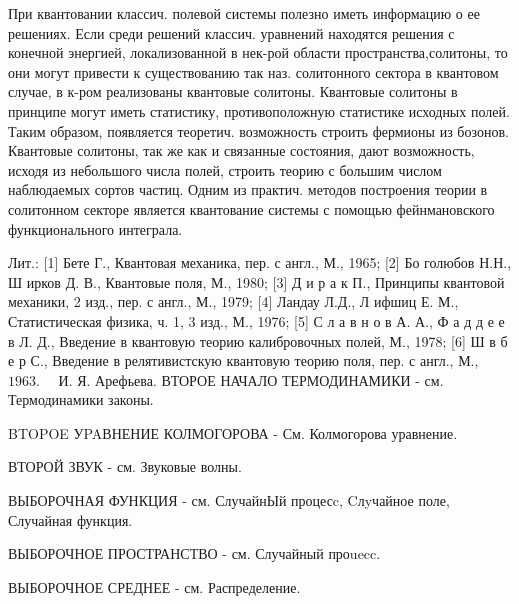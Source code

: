 \documentclass[10pt]{article}
\begin{document}
При квантовании классич. полевой системы полезно иметь информацию о ее решениях. Если среди решений классич. уравнений находятся решения с конечной энергией, локализованной в нек-рой области пространства,солитоны, то они могут привести к существованию так наз. солитонного сектора в квантовом случае, в к-ром реализованы квантовые солитоны. Квантовые солитоны в принципе могут иметь статистику, противоположную статистике исходных полей. Таким образом, появляется теоретич. возможность строить фермионы из бозонов. Квантовые солитоны, так же как и связанные состояния, дают возможность, исходя из небольшого числа полей, строить теорию с большим числом наблюдаемых сортов частиц. Одним из практич. методов построения теории в солитонном секторе является квантование системы с помощью фейнмановского функционального интеграла.



Лит.: [1] Бете Г., Квантовая механика, пер. с англ., М., 1965; [2] Бо голюбов Н.Н., Ш ирков Д. В., Квантовые поля, М., 1980; [3] Д и р а к П., Принципы квантовой механики, 2 изд., пер. с англ., М., 1979; [4] Ландау Л.Д., Л ифшиц Е. М., Статистическая физика, ч. 1, 3 изд., М., 1976; [5] С л а в н о в А. А., Ф а д д е е в Л. Д., Введение в квантовую теорию калибровочных полей, М., 1978; [6] Ш в б е р С., Введение в релятивистскую квантовую теорию поля, пер. с англ., М., $1963 . \quad$ И. Я. Арефьева. ВТОРОЕ НАЧАЛО ТЕРМОДИНАМИКИ - см. Термодинамики законы.



BTOPOE УPAВНЕНИЕ КОЛМОГОРОВА - См. Колмогорова уравнение.



ВТОРОЙ ЗВУК - см. Звуковые волны.



ВЫБОРОЧНАЯ ФУНКЦИЯ - см. СлучайнЫй процесc, Cлyчайное поле, Случайная функция.



ВЫБОРОЧНОЕ ПРОСТРАНСТВО - см. Случайный проuecc.



ВЫБОРОЧНОЕ СРЕДНЕЕ - см. Распределение.
\end{document}
